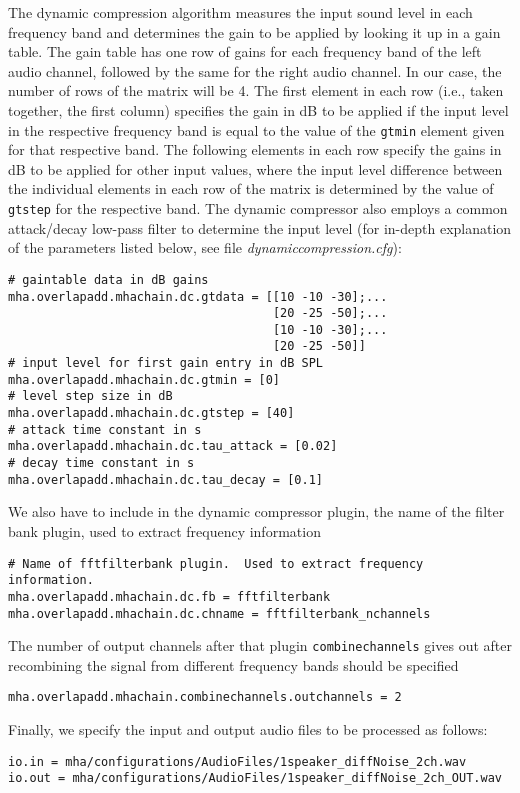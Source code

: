 %
The dynamic compression algorithm measures the input sound level in 
each frequency band and determines the gain to be applied by looking 
it up in a gain table. The gain table has one row of gains for each 
frequency band of the left audio channel, followed by the same for 
the right audio channel. In our case, the number of rows of the 
matrix will be 4.
%
The first element in each row (i.e., taken together, the first
column) specifies the gain in dB to be applied if the input level in
the respective frequency band is equal to the value of the \verb!gtmin!
element given for that respective band.
%
The following elements in each row specify the gains in dB to be
applied for other input values, where the input level difference
between the individual elements in each row of the matrix is
determined by the value of \verb!gtstep! for the respective 
band. The dynamic compressor also employs a common attack/decay low-pass filter
to determine the input level (for in-depth explanation of the parameters 
listed below, see file \emph{dynamiccompression.cfg}):
\begin{verbatim}
# gaintable data in dB gains
mha.overlapadd.mhachain.dc.gtdata = [[10 -10 -30];...
                                     [20 -25 -50];...
                                     [10 -10 -30];...
                                     [20 -25 -50]]
# input level for first gain entry in dB SPL
mha.overlapadd.mhachain.dc.gtmin = [0]
# level step size in dB
mha.overlapadd.mhachain.dc.gtstep = [40]
# attack time constant in s
mha.overlapadd.mhachain.dc.tau_attack = [0.02]
# decay time constant in s
mha.overlapadd.mhachain.dc.tau_decay = [0.1]
\end{verbatim}
%
We also have to include in the dynamic compressor plugin, the name 
of the filter bank plugin, used to extract frequency information
\begin{verbatim}
# Name of fftfilterbank plugin.  Used to extract frequency information.
mha.overlapadd.mhachain.dc.fb = fftfilterbank
mha.overlapadd.mhachain.dc.chname = fftfilterbank_nchannels
\end{verbatim}
%
The number of output channels after that plugin \verb!combinechannels! 
gives out after recombining the signal from different frequency 
bands should be specified
\begin{verbatim}
mha.overlapadd.mhachain.combinechannels.outchannels = 2
\end{verbatim}
%
Finally, we specify the input and output audio files to be processed as 
follows:
\begin{verbatim}
io.in = mha/configurations/AudioFiles/1speaker_diffNoise_2ch.wav
io.out = mha/configurations/AudioFiles/1speaker_diffNoise_2ch_OUT.wav
\end{verbatim}
